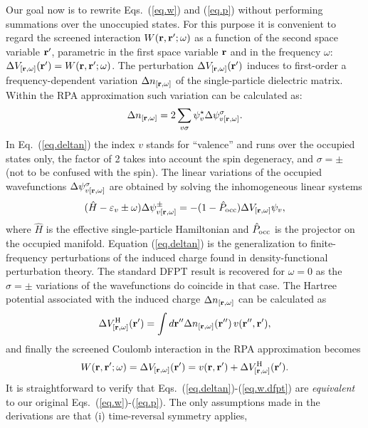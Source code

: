 \documentclass[twocolumn,prb,showpacs,superscriptaddress]{revtex4}
\def\w{\omega}
\def\H{\hat{H}}
\def\P{\hat{P}_{\rm occ}}
\def\E{\varepsilon}
\def\s{\sigma}
\def\r{{\bf r}}
\def\rp{{\bf r^\prime}}
\def\rpp{{\bf r^{\prime\prime}}}
\begin{document}
Our goal now is to rewrite Eqs.\ (\ref{eq.w}) and (\ref{eq.p})
without performing summations over the unoccupied states.
For this purpose it is convenient to regard the screened interaction
$W(\r,\rp;\w)$ as a function of the 
second space variable $\rp$, parametric in the first space variable 
$\r$ and in the frequency $\w$: $\Delta V_{[\r,\w]}(\rp) = W(\r,\rp;\w)$.
The perturbation $\Delta V_{[\r,\w]}(\rp)$ induces to first-order 
a frequency-dependent variation $\Delta n_{[\r,\w]}$ of the single-particle 
dielectric matrix. Within the RPA approximation such
variation can be calculated as:
  \begin{equation}\label{eq.deltan}
  \Delta n_{[\r,\w]} = 2\sum_{v\s} \psi_v^\star  \Delta \psi^\s_{v[\r,\w]}.
  \end{equation}
In Eq.\ (\ref{eq.deltan}) the index $v$ stands for ``valence'' and runs
over the occupied states only, the factor of 2 takes into account the
spin degeneracy, and $\sigma=\pm$ (not to be confused with the spin).
The linear variations of the occupied wavefunctions $\Delta \psi^\s_{v[\r,\w]}$
are obtained by solving the inhomogeneous linear systems
  \begin{equation}\label{eq.linsys}\label{eq.linsys.1}
  (\H-\E_v\pm\w) \Delta \psi^\pm_{v[\r,\w]}  = -(1-\P)  \Delta V_{[\r,\w]} \psi_v, 
  \end{equation}
where $\H$ is the effective single-particle Hamiltonian and $\P$ is the projector
on the occupied manifold.
Equation (\ref{eq.deltan}) is the generalization to finite-frequency perturbations
of the induced charge found in density-functional perturbation theory.\cite{baroni.rmp} 
The standard DFPT result is recovered for $\w=0$ as the $\sigma=\pm$ variations
of the wavefunctions do coincide in that case.
The Hartree potential associated with the induced charge $\Delta n_{[\r,\w]}$
can be calculated as
  \begin{equation}
  \Delta V^{\rm H}_{[\r,\w]}(\rp) = \int d\rpp \Delta n_{[\r,\w]} (\rpp) \, v(\rpp,\rp),
  \end{equation}
and finally the screened Coulomb interaction in the RPA approximation becomes
  \begin{equation}\label{eq.w.dfpt}
  W(\r,\rp;\w) = \Delta V_{[\r,\w]}(\rp) = v(\r,\rp) + \Delta V^{\rm H}_{[\r,\w]}(\rp).
  \end{equation}
It is straightforward to verify that Eqs.\ (\ref{eq.deltan})-(\ref{eq.w.dfpt})
are {\it equivalent} to our original Eqs.\ (\ref{eq.w})-(\ref{eq.p}).
The only assumptions made in the derivations are that (i) time-reversal symmetry applies,
\end{document}
